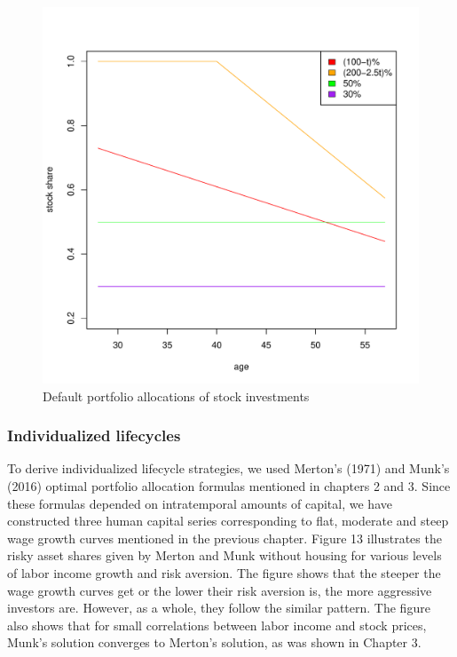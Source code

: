 \documentclass[]{article}
\begin{document}
\begin{figure}[h]
	\centering
	\includegraphics[scale=0.6]{figs/defaults.pdf}
	\caption{Default portfolio allocations of stock investments}
\end{figure}


\subsubsection{Individualized lifecycles}

To derive individualized lifecycle strategies, we used Merton's (1971) and Munk's (2016) optimal portfolio allocation formulas mentioned in chapters 2 and 3. Since these formulas depended on intratemporal amounts of capital, we have constructed three human capital series corresponding to flat, moderate and steep wage growth curves mentioned in the previous chapter. Figure 13 illustrates the risky asset shares given by Merton and Munk without housing for various levels of labor income growth and risk aversion. The figure shows that the steeper the wage growth curves get or the lower their risk aversion is, the more aggressive investors are. However, as a whole, they follow the similar pattern. The figure also shows that for small correlations between labor income and stock prices, Munk's solution converges to Merton's solution, as was shown in Chapter 3.
\end{document}
